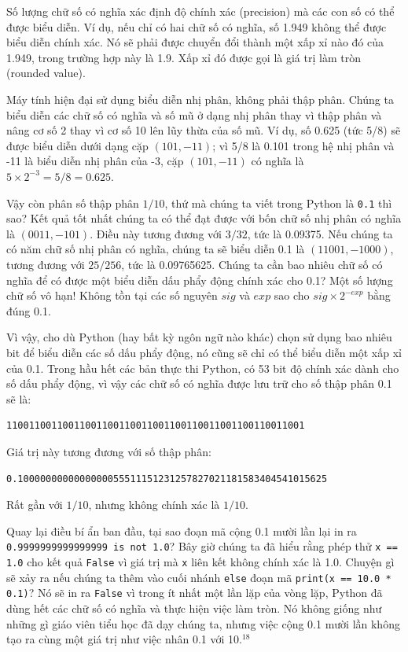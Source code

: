 Số lượng chữ số có nghĩa xác định độ chính xác (precision) mà các con số có thể được biểu diễn. Ví dụ, nếu chỉ có hai chữ số có nghĩa, số 1.949 không thể được biểu diễn chính xác. Nó sẽ phải được chuyển đổi thành một xấp xỉ nào đó của 1.949, trong trường hợp này là 1.9. Xấp xỉ đó được gọi là giá trị làm tròn (rounded value).

Máy tính hiện đại sử dụng biểu diễn nhị phân, không phải thập phân. Chúng ta biểu diễn các chữ số có nghĩa và số mũ ở dạng nhị phân thay vì thập phân và nâng cơ số 2 thay vì cơ số 10 lên lũy thừa của số mũ. Ví dụ, số 0.625 (tức 5/8) sẽ được biểu diễn dưới dạng cặp $(101, -11)$; vì 5/8 là 0.101 trong hệ nhị phân và -11 là biểu diễn nhị phân của -3, cặp $(101, -11)$ có nghĩa là $5 \times 2^{-3} = 5/8 = 0.625$.

Vậy còn phân số thập phân $1/10$, thứ mà chúng ta viết trong Python là \texttt{0.1} thì sao? Kết quả tốt nhất chúng ta có thể đạt được với bốn chữ số nhị phân có nghĩa là $(0011, -101)$. Điều này tương đương với $3/32$, tức là 0.09375. Nếu chúng ta có năm chữ số nhị phân có nghĩa, chúng ta sẽ biểu diễn 0.1 là $(11001, -1000)$, tương đương với $25/256$, tức là 0.09765625. Chúng ta cần bao nhiêu chữ số có nghĩa để có được một biểu diễn dấu phẩy động chính xác cho 0.1? Một số lượng chữ số vô hạn! Không tồn tại các số nguyên $sig$ và $exp$ sao cho $sig \times 2^{-exp}$ bằng đúng 0.1.

Vì vậy, cho dù Python (hay bất kỳ ngôn ngữ nào khác) chọn sử dụng bao nhiêu bit để biểu diễn các số dấu phẩy động, nó cũng sẽ chỉ có thể biểu diễn một xấp xỉ của 0.1. Trong hầu hết các bản thực thi Python, có 53 bit độ chính xác dành cho số dấu phẩy động, vì vậy các chữ số có nghĩa được lưu trữ cho số thập phân 0.1 sẽ là:

\begin{verbatim}
11001100110011001100110011001100110011001100110011001
\end{verbatim}

Giá trị này tương đương với số thập phân:

\begin{verbatim}
0.1000000000000000055511151231257827021181583404541015625
\end{verbatim}

Rất gần với $1/10$, nhưng không chính xác là $1/10$.

Quay lại điều bí ẩn ban đầu, tại sao đoạn mã cộng 0.1 mười lần lại in ra \texttt{0.9999999999999999 is not 1.0}? Bây giờ chúng ta đã hiểu rằng phép thử \texttt{x == 1.0} cho kết quả \texttt{False} vì giá trị mà \texttt{x} liên kết không chính xác là 1.0. Chuyện gì sẽ xảy ra nếu chúng ta thêm vào cuối nhánh \texttt{else} đoạn mã \texttt{print(x == 10.0 * 0.1)}? Nó sẽ in ra \texttt{False} vì trong ít nhất một lần lặp của vòng lặp, Python đã dùng hết các chữ số có nghĩa và thực hiện việc làm tròn. Nó không giống như những gì giáo viên tiểu học đã dạy chúng ta, nhưng việc cộng 0.1 mười lần không tạo ra cùng một giá trị như việc nhân 0.1 với 10.$^{18}$

